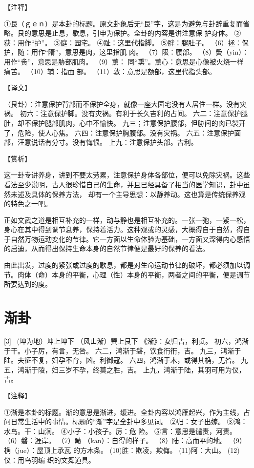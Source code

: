 \documentclass[12pt,UTF8]{ctexbook}
\begin{document}
【注释】

①艮（ｇｅｎ）是本卦的标题。原文卦象后无“艮”字，这是为避免与卦辞重复而省略。艮的意思是止息，歇息，引申为保护。全卦的内容是讲注意保 护身体。
②获：用作“护”。
③庭：园宅。
④趾：这里代指脚。
⑤胖：腿肚子。
（6）拯：保护，随：用作“隋”，意思是肉，这里指肌 肉。
（7）限：腰部。
（8）夤（yin）：用作“夤”，意思是胁部肌肉。
（9）薰： 同“熏”。薰心：意思是心像被火烧一样痛苦。
（10）辅：指面 部。
（11）敦：意思是额部，这里代指头部。

【译文】

（艮卦）：注意保护背部而不保护全身，就像一座大园宅没有人居住一样。没有灾祸。
初六：注意保护脚。没有灾祸。有利于长久吉利的占间。
六二：注意保护腿肚，却不保护腿部肌肉，心中不愉快。
九三；注意保护腰部，但胁间的肉已裂开了，危险，使人心焦。
六四：注意保护胸腹部。没有灾祸。
六五：注意保护面部，汪意说话有分寸。没有悔恨。
上九：注意保护头部。吉利。

【赏析】

这一卦专讲养身，讲到不要太劳累，注意保护身体各部位，便可以免除灾祸。这些看法至少说明，古人很珍惜自己的生命，并且已经具备了相当的医学知识，卦中虽然未述及具体的保养方法， 却有一个主导思想：以静养动。这也算是传统保养观的特色之一吧。

正如文武之道是相互补充的一样，动与静也是相互补充的。一张一弛，一紧一松，身心在其中得到调节息养，保持着活力。这种观或的灵感，大概得自于自然，得自于自然万物运动变化的节律。它一方面以生命体验为基础，一方面又深得内心感悟的启迪，从而得出保持生命本身的自然节律便是最好的保养的看法。

由此出发，过度的紧张或过度的歇息，都是对生命运动节律的破坏，都必须加以调节。肉体（命）本身的平衡，心理（性）本身的平衡，两者之间的平衡，便是调节所要达到的度。

\chapter{渐卦}
[3] \ (坤为地）坤上坤下
（风山渐）巽上艮下
《渐》：女归吉，利贞。
初六，鸿渐于干。小子厉，有言，无咎。
六二，鸿渐于磐，饮食衎衎，吉。
九三，鸿渐于陆。夫征不复，妇孕不育，凶。利御寇。
六四，鸿渐于木，或得其桷，无咎。
九五，鸿渐于陵，妇三岁不孕，终莫之胜，吉。
上九，鸿渐于陆，其羽可用为仪，吉。

【注释】

①渐是本卦的标题。渐的意思是渐进，缓进。全卦内容以鸿雁起兴，作为主线，占问日常生活中的事情。标题的“渐”字是全卦中多见词。
②归：女子出嫁。
③鸿：水鸟。干：山涧。
④小子：小孩子。厉：危 险。
⑤言：意思是谴责，河责。
（6）磐：涯岸。
（7）瞰 （kan）：自得的样子。
（8）陆：高而平的地。
（9）桷（jue）：屋顶上承瓦 的方木条。
(10)胜：欺凌，欺侮。
(11)阿：大山。
(12)仪：用鸟羽编 织的文舞道具。
\end{document}
